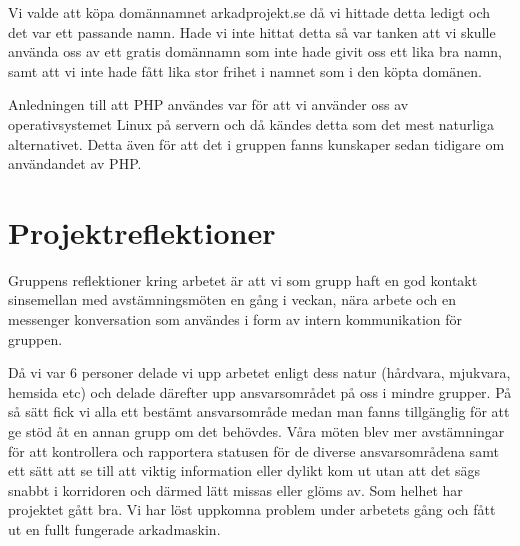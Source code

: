 \documentclass[12pt,fleqn,openany]{book} %
\begin{document}
Vi valde att köpa domännamnet arkadprojekt.se då vi hittade detta ledigt och det var ett passande namn. Hade vi inte hittat
detta så var tanken att vi skulle använda oss av ett gratis domännamn som inte hade givit oss ett lika bra namn, samt att vi inte
hade fått lika stor frihet i namnet som i den köpta domänen.  

Anledningen till att PHP användes var för att vi använder oss av operativsystemet Linux på servern och då kändes detta som det mest 
naturliga alternativet. Detta även för att det i gruppen fanns kunskaper sedan tidigare om användandet av PHP.

\chapter{Projektreflektioner}


Gruppens reflektioner kring arbetet är att vi som grupp haft en god kontakt sinsemellan med avstämningsmöten en gång i veckan, nära 
arbete och en messenger konversation som användes i form av intern kommunikation för gruppen.
\bigskip

Då vi var 6 personer delade vi upp arbetet enligt dess natur (hårdvara, mjukvara, hemsida etc) och delade därefter upp ansvarsområdet 
på oss i mindre grupper. På så sätt fick vi alla ett bestämt ansvarsområde medan man fanns tillgänglig för att ge stöd åt en annan 
grupp om det behövdes. Våra möten blev mer avstämningar för att kontrollera och rapportera statusen för de diverse ansvarsområdena 
samt ett sätt att se till att viktig information eller dylikt kom ut utan att det sägs snabbt i korridoren och därmed lätt missas 
eller glöms av. Som helhet har projektet gått bra. Vi har löst uppkomna problem under arbetets gång och fått ut en fullt fungerade arkadmaskin. 
\bigskip
\end{document}
